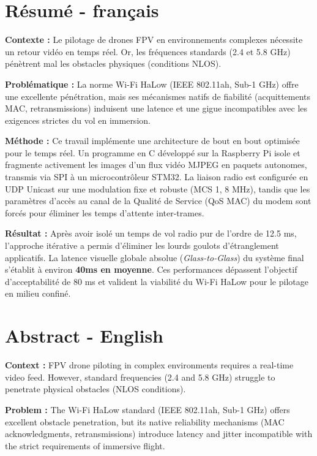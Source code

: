\section{Résumé - français}

\textbf{Contexte :} Le pilotage de drones FPV en environnements complexes nécessite un 
retour vidéo en temps réel. Or, les fréquences standards (2.4 et 5.8 GHz) pénètrent mal 
les obstacles physiques (conditions NLOS). 

\textbf{Problématique :} La norme Wi-Fi HaLow (IEEE 802.11ah, Sub-1 GHz) offre une excellente 
pénétration, mais ses mécanismes natifs de fiabilité (acquittements MAC, retransmissions) 
induisent une latence et une gigue incompatibles avec les exigences strictes du vol en immersion.

\textbf{Méthode :} Ce travail implémente une architecture de bout en bout optimisée pour le temps réel. 
Un programme en C développé sur la Raspberry Pi isole et fragmente activement les images d'un flux vidéo 
MJPEG en paquets autonomes, transmis via SPI à un microcontrôleur STM32. La liaison radio 
est configurée en UDP Unicast sur une modulation fixe et robuste (MCS 1, 8 MHz), tandis que les paramètres 
d'accès au canal de la Qualité de Service (QoS MAC) du modem sont forcés pour éliminer les temps d'attente 
inter-trames.

\textbf{Résultat :} Après avoir isolé un temps de vol radio pur de l'ordre de 12.5 ms, l'approche itérative 
a permis d'éliminer les lourds goulots d'étranglement applicatifs. La latence visuelle globale absolue 
(\textit{Glass-to-Glass}) du système final s'établit à environ \textbf{40ms en moyenne}. Ces performances 
dépassent l'objectif d'acceptabilité de 80 ms et valident la viabilité du Wi-Fi HaLow pour le pilotage en milieu confiné.

\section{Abstract - English}

\textbf{Context :} FPV drone piloting in complex environments requires a real-time video feed. However, 
standard frequencies (2.4 and 5.8 GHz) struggle to penetrate physical obstacles (NLOS conditions).

\textbf{Problem :} The Wi-Fi HaLow standard (IEEE 802.11ah, Sub-1 GHz) offers excellent obstacle 
penetration, but its native reliability mechanisms (MAC acknowledgments, retransmissions) introduce 
latency and jitter incompatible with the strict requirements of immersive flight.

